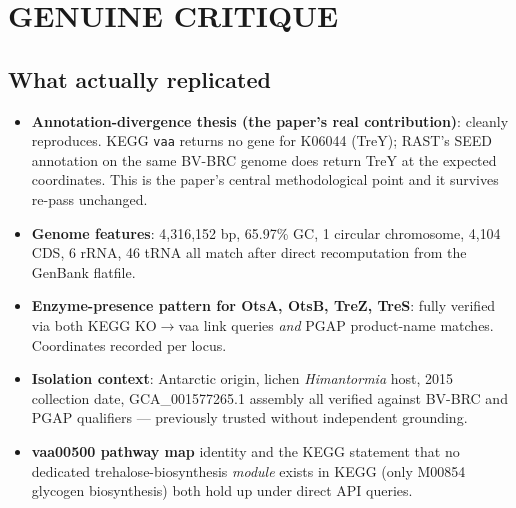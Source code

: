 \documentclass[11pt,letterpaper]{article}
\begin{document}
\section*{GENUINE CRITIQUE}
\subsection*{What actually replicated}
\begin{itemize}[leftmargin=1.2em,itemsep=1pt]
  \item \textbf{Annotation-divergence thesis (the paper's real contribution)}: cleanly reproduces. KEGG \texttt{vaa} returns no gene for K06044 (TreY); RAST's SEED annotation on the same BV-BRC genome does return TreY at the expected coordinates. This is the paper's central methodological point and it survives re-pass unchanged.
  \item \textbf{Genome features}: 4{,}316{,}152 bp, 65.97\% GC, 1 circular chromosome, 4{,}104 CDS, 6 rRNA, 46 tRNA all match after direct recomputation from the GenBank flatfile.
  \item \textbf{Enzyme-presence pattern for OtsA, OtsB, TreZ, TreS}: fully verified via both KEGG KO$\to$vaa link queries \emph{and} PGAP product-name matches. Coordinates recorded per locus.
  \item \textbf{Isolation context}: Antarctic origin, lichen \textit{Himantormia} host, 2015 collection date, GCA\_001577265.1 assembly all verified against BV-BRC and PGAP qualifiers --- previously trusted without independent grounding.
  \item \textbf{vaa00500 pathway map} identity and the KEGG statement that no dedicated trehalose-biosynthesis \emph{module} exists in KEGG (only M00854 glycogen biosynthesis) both hold up under direct API queries.
\end{itemize}
\end{document}
